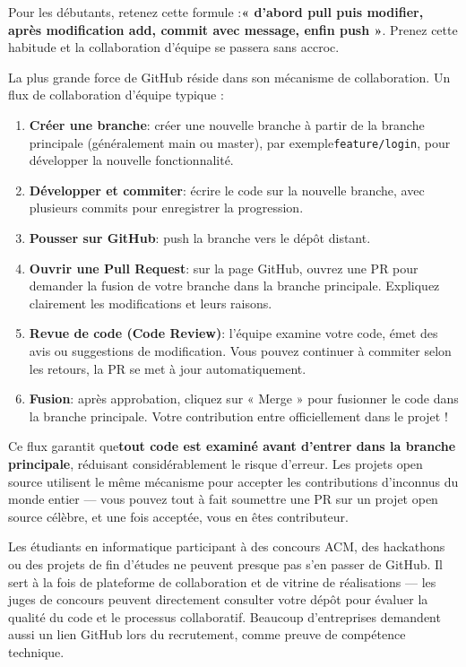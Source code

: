 Pour les débutants, retenez cette formule :\textbf{« d’abord pull puis modifier, après modification add, commit avec message, enfin push »}. Prenez cette habitude et la collaboration d’équipe se passera sans accroc.


La plus grande force de GitHub réside dans son mécanisme de collaboration. Un flux de collaboration d'équipe typique :

\begin{enumerate}
  \item \textbf{Créer une branche}: créer une nouvelle branche à partir de la branche principale (généralement main ou master), par exemple\texttt{feature/\allowbreak login}, pour développer la nouvelle fonctionnalité.
  \item \textbf{Développer et commiter}: écrire le code sur la nouvelle branche, avec plusieurs commits pour enregistrer la progression.
  \item \textbf{Pousser sur GitHub}: push la branche vers le dépôt distant.
  \item \textbf{Ouvrir une Pull Request}: sur la page GitHub, ouvrez une PR pour demander la fusion de votre branche dans la branche principale. Expliquez clairement les modifications et leurs raisons.
  \item \textbf{Revue de code (Code Review)}: l’équipe examine votre code, émet des avis ou suggestions de modification. Vous pouvez continuer à commiter selon les retours, la PR se met à jour automatiquement.
  \item \textbf{Fusion}: après approbation, cliquez sur « Merge » pour fusionner le code dans la branche principale. Votre contribution entre officiellement dans le projet !
\end{enumerate}

Ce flux garantit que\textbf{tout code est examiné avant d’entrer dans la branche principale}, réduisant considérablement le risque d’erreur. Les projets open source utilisent le même mécanisme pour accepter les contributions d’inconnus du monde entier — vous pouvez tout à fait soumettre une PR sur un projet open source célèbre, et une fois acceptée, vous en êtes contributeur.



Les étudiants en informatique participant à des concours ACM, des hackathons ou des projets de fin d'études ne peuvent presque pas s'en passer de GitHub. Il sert à la fois de plateforme de collaboration et de vitrine de réalisations — les juges de concours peuvent directement consulter votre dépôt pour évaluer la qualité du code et le processus collaboratif. Beaucoup d'entreprises demandent aussi un lien GitHub lors du recrutement, comme preuve de compétence technique.

